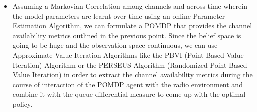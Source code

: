 \documentclass{article}
\begin{document}
\begin{itemize}
\begin{itemize}
\begin{itemize}
        \end{itemize}
    \end{itemize}
    \item Assuming a Markovian Correlation among channels and across time wherein the model parameters are learnt over time using an online Parameter Estimation Algorithm, we can formulate a POMDP that provides the channel availability metrics outlined in the previous point. Since the belief space is going to be huge and the observation space continuous, we can use Approximate Value Iteration Algorithms like the PBVI (Point-Based Value Iteration) Algorithm or the PERSEUS Algorithm (Randomized Point-Based Value Iteration) in order to extract the channel availability metrics during the course of interaction of the POMDP agent with the radio environment and combine it with the queue differential measure to come up with the optimal policy.
\end{itemize}
\end{document}
